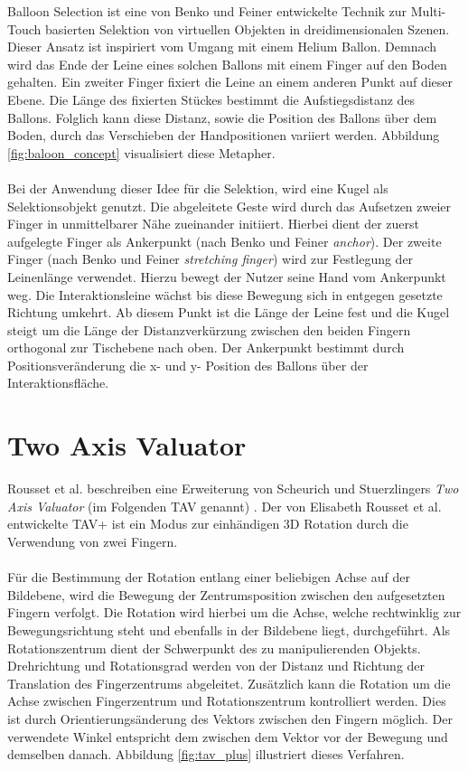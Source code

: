 Balloon Selection ist eine von Benko und Feiner \cite{benko:2007} entwickelte Technik zur Multi-Touch basierten Selektion von virtuellen Objekten in dreidimensionalen Szenen. Dieser Ansatz ist inspiriert vom Umgang mit einem Helium Ballon. Demnach wird das Ende der Leine eines solchen Ballons mit einem Finger auf den Boden gehalten. Ein zweiter Finger fixiert die Leine an einem anderen Punkt auf dieser Ebene. Die Länge des fixierten Stückes bestimmt die Aufstiegsdistanz des Ballons. Folglich kann diese Distanz, sowie die Position des Ballons über dem Boden, durch das Verschieben der Handpositionen variiert werden. Abbildung \ref{fig:baloon_concept} visualisiert diese Metapher.
\\\\
Bei der Anwendung dieser Idee für die Selektion, wird eine Kugel als Selektionsobjekt genutzt. Die abgeleitete Geste wird durch das Aufsetzen zweier Finger in unmittelbarer Nähe zueinander initiiert. Hierbei dient der zuerst aufgelegte Finger als Ankerpunkt (nach Benko und Feiner \emph{anchor}). Der zweite Finger (nach Benko und Feiner \emph{stretching finger}) wird zur Festlegung der Leinenlänge verwendet. Hierzu bewegt der Nutzer seine Hand vom Ankerpunkt weg. Die Interaktionsleine wächst bis diese Bewegung sich in entgegen gesetzte Richtung umkehrt. Ab diesem Punkt ist die Länge der Leine fest und die Kugel steigt um die Länge der Distanzverkürzung zwischen den beiden Fingern orthogonal zur Tischebene nach oben. Der Ankerpunkt bestimmt durch Positionsveränderung die x- und y- Position des Ballons über der Interaktionsfläche.


\section{Two Axis Valuator}
\label{sec:related_two_axis_valuator}

Rousset et al. beschreiben eine Erweiterung von Scheurich und Stuerzlingers \emph{Two Axis Valuator} (im Folgenden TAV genannt) \linebreak \cite{scheurich:2013} \cite{rousset:2014}. Der von Elisabeth \linebreak Rousset et al. entwickelte TAV+ ist ein Modus zur einhändigen 3D Rotation durch die Verwendung von zwei Fingern. 
\\\\
Für die Bestimmung der Rotation entlang einer beliebigen Achse auf der Bildebene, wird die Bewegung der Zentrumsposition zwischen den aufgesetzten Fingern verfolgt. Die Rotation wird hierbei um die Achse, welche rechtwinklig zur Bewegungsrichtung steht und ebenfalls in der Bildebene liegt, durchgeführt. Als Rotationszentrum dient der Schwerpunkt des zu manipulierenden Objekts. Drehrichtung und Rotationsgrad werden von der Distanz und Richtung der Translation des Fingerzentrums abgeleitet. Zusätzlich kann die Rotation um die Achse zwischen Fingerzentrum und Rotationszentrum kontrolliert werden. Dies ist durch Orientierungsänderung des Vektors zwischen den Fingern möglich. Der verwendete Winkel entspricht dem zwischen dem Vektor vor der Bewegung und demselben danach. Abbildung \ref{fig:tav_plus} illustriert dieses Verfahren.

